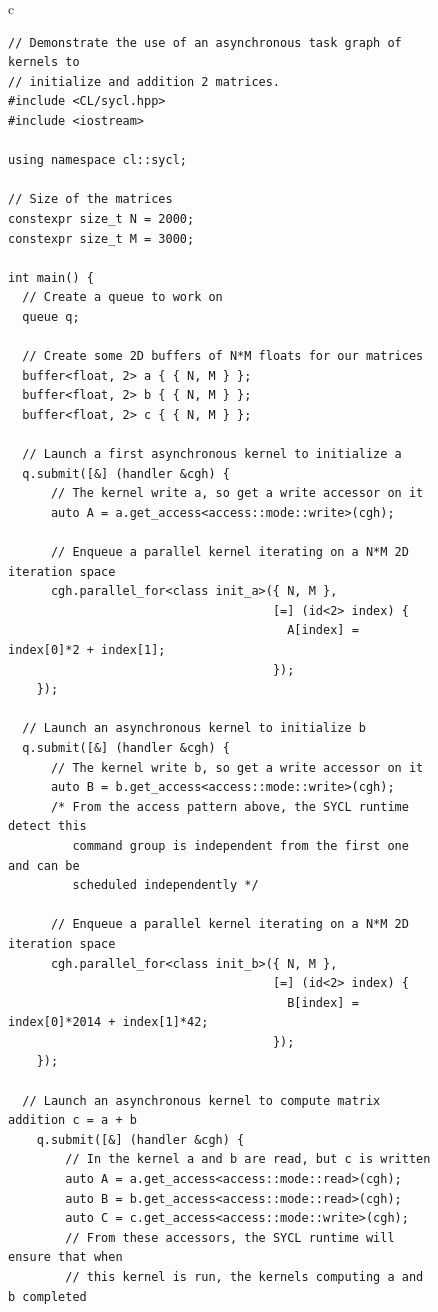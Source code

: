 \documentclass[sigplan, review]{acmart}
\begin{document}
\begin{figure}
  \begin{tabular}{c}
    \begin{lstlisting}[basicstyle=\scriptsize]
// Demonstrate the use of an asynchronous task graph of kernels to
// initialize and addition 2 matrices.
#include <CL/sycl.hpp>
#include <iostream>

using namespace cl::sycl;

// Size of the matrices
constexpr size_t N = 2000;
constexpr size_t M = 3000;

int main() {
  // Create a queue to work on
  queue q;

  // Create some 2D buffers of N*M floats for our matrices
  buffer<float, 2> a { { N, M } };
  buffer<float, 2> b { { N, M } };
  buffer<float, 2> c { { N, M } };

  // Launch a first asynchronous kernel to initialize a
  q.submit([&] (handler &cgh) {
      // The kernel write a, so get a write accessor on it
      auto A = a.get_access<access::mode::write>(cgh);

      // Enqueue a parallel kernel iterating on a N*M 2D iteration space
      cgh.parallel_for<class init_a>({ N, M },
                                     [=] (id<2> index) {
                                       A[index] = index[0]*2 + index[1];
                                     });
    });

  // Launch an asynchronous kernel to initialize b
  q.submit([&] (handler &cgh) {
      // The kernel write b, so get a write accessor on it
      auto B = b.get_access<access::mode::write>(cgh);
      /* From the access pattern above, the SYCL runtime detect this
         command group is independent from the first one and can be
         scheduled independently */

      // Enqueue a parallel kernel iterating on a N*M 2D iteration space
      cgh.parallel_for<class init_b>({ N, M },
                                     [=] (id<2> index) {
                                       B[index] = index[0]*2014 + index[1]*42;
                                     });
    });

  // Launch an asynchronous kernel to compute matrix addition c = a + b
    q.submit([&] (handler &cgh) {
        // In the kernel a and b are read, but c is written
        auto A = a.get_access<access::mode::read>(cgh);
        auto B = b.get_access<access::mode::read>(cgh);
        auto C = c.get_access<access::mode::write>(cgh);
        // From these accessors, the SYCL runtime will ensure that when
        // this kernel is run, the kernels computing a and b completed


\end{lstlisting}
\end{tabular}
\end{figure}
\end{document}
